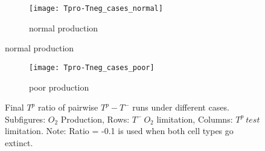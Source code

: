 \begin{figure}[h!]
  \centering
  \begin{subfigure}[b]{\textwidth}
    \centering
    \texttt{[image: Tpro-Tneg\_cases\_normal]}
    \caption{normal production}
    \label{fig_Tpro-Tneg_cases_normal}
  \end{subfigure}
\end{figure}
\begin{figure}[h!]\ContinuedFloat
  \centering
  \begin{subfigure}[b]{\textwidth}
    \centering
    \texttt{[image: Tpro-Tneg\_cases\_poor]}
    \caption{poor production}
    \label{fig_Tpro-Tneg_cases_poor}
  \end{subfigure}
  \caption[Final $T^p$ ratio of pairwise $T^p - T^-$ runs under different cases]{Final $T^p$ ratio of pairwise $T^p - T^-$ runs under different cases. Subfigures: $O_2$ Production, Rows: $T^-\ O_2$ limitation, Columns: $T^p\ test$ limitation. Note: Ratio = -0.1 is used when both cell types go extinct.}
  \label{fig_Tpro-Tneg_cases}
\end{figure}
\newpage
